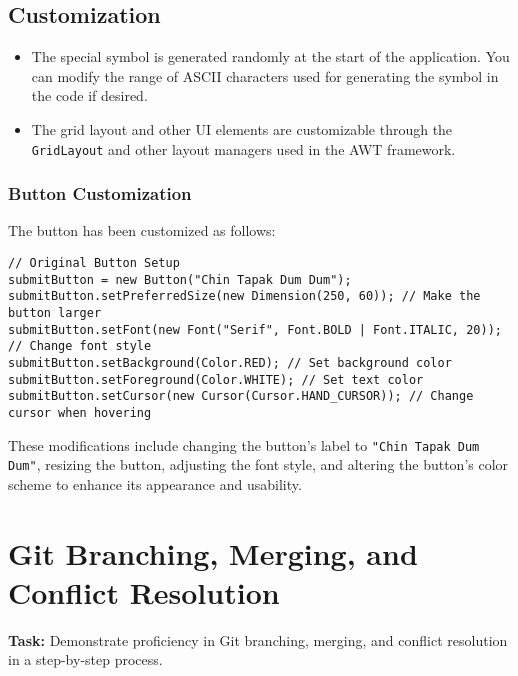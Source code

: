 \documentclass[a4paper,15pt]{article}
\begin{document}
\begin{itemize}[leftmargin=1.5cm]
\subsection{Customization}
\begin{itemize}
    \item The special symbol is generated randomly at the start of the application. You can modify the range of ASCII characters used for generating the symbol in the code if desired.
    \item The grid layout and other UI elements are customizable through the \texttt{GridLayout} and other layout managers used in the AWT framework.
\end{itemize}

\subsubsection{Button Customization}
The button has been customized as follows:

\begin{verbatim}
// Original Button Setup
submitButton = new Button("Chin Tapak Dum Dum");
submitButton.setPreferredSize(new Dimension(250, 60)); // Make the button larger
submitButton.setFont(new Font("Serif", Font.BOLD | Font.ITALIC, 20)); // Change font style
submitButton.setBackground(Color.RED); // Set background color
submitButton.setForeground(Color.WHITE); // Set text color
submitButton.setCursor(new Cursor(Cursor.HAND_CURSOR)); // Change cursor when hovering
\end{verbatim}

These modifications include changing the button's label to \texttt{"Chin Tapak Dum Dum"}, resizing the button, adjusting the font style, and altering the button's color scheme to enhance its appearance and usability.

 \end{itemize}
 \section{ Git Branching, Merging, and Conflict Resolution}

\textbf{Task:} Demonstrate proficiency in Git branching, merging, and conflict resolution in a step-by-step process.
\end{document}
